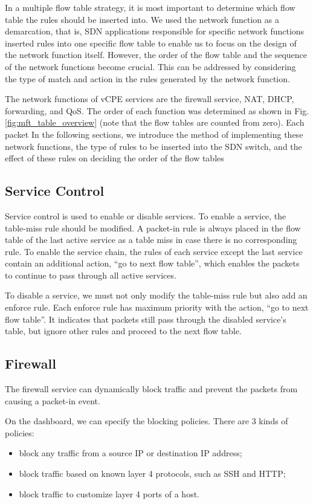 \documentclass[journal]{IEEEtran}
\begin{document}
In a multiple flow table strategy, it is most important to determine which flow table the rules should be inserted into. We used the network function as a demarcation, that is, SDN applications responsible for specific network functions inserted rules into one specific flow table to enable us to focus on the design of the network function itself. However, the order of the flow table and the sequence of the network functions become crucial. This can be addressed by considering the type of match and action in the rules generated by the network function.

The network functions of vCPE services are the firewall service, NAT, DHCP, forwarding, and QoS. The order of each function was determined as shown in Fig. \ref{fig:mft_table_overview} (note that the flow tables are counted from zero). Each packet In the following sections, we introduce the method of implementing these network functions, the type of rules to be inserted into the SDN switch, and the effect of these rules on deciding the order of the flow tables



\subsection{Service Control}
Service control is used to enable or disable services. To enable a service, the table-miss rule should be modified. A packet-in rule is always placed in the flow table of the last active service as a table miss in case there is no corresponding rule. To enable the service chain, the rules of each service except the last service contain an additional action, ``go to next flow table'', which enables the packets to continue to pass through all active services.

To disable a service, we must not only modify the table-miss rule but also add an enforce rule. Each enforce rule has maximum priority with the action, ``go to next flow table''. It indicates that packets still pass through the disabled service’s table, but ignore other rules and proceed to the next flow table.



\subsection{Firewall}
The firewall service can dynamically block traffic and prevent the packets from causing a packet-in event.

On the dashboard, we can specify the blocking policies. There are 3 kinds of policies:
\begin{itemize}[]
\item block any traffic from a source IP or destination IP address;
\item block traffic based on known layer 4 protocols, such as SSH and HTTP;
\item block traffic to customize layer 4 ports of a host.
\end{itemize}
\end{document}
